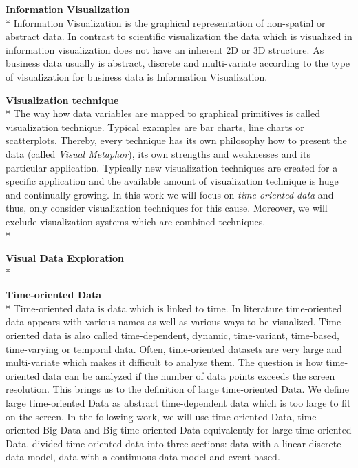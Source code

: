 \textbf{Information Visualization}\\*
Information Visualization is the graphical representation of non-spatial or abstract data\cite{Keim}. In contrast to scientific visualization the data which is visualized in information visualization does not have an inherent 2D or 3D structure\cite{Shneiderman2008}. 
As business data usually is abstract, discrete and multi-variate according to \cite{Tegarden1999} the type of visualization for business data is Information Visualization.

\textbf{Visualization technique}\\*
The way how data variables are mapped to graphical primitives is called visualization technique. Typical examples are bar charts, line charts or scatterplots. Thereby, every technique has its own philosophy how to present the data (called \textit{Visual Metaphor}\cite{Tegarden1999}), its own strengths and weaknesses and its particular application. Typically new visualization techniques are created for a specific application and the available amount of visualization technique is huge and continually growing. In this work we will focus on \textit{time-oriented data} and thus, only consider visualization techniques for this cause. Moreover, we will exclude visualization systems which are combined techniques. 
\\*

\textbf{Visual Data Exploration}\\*

\textbf{Time-oriented Data}\\*
Time-oriented data is data which is linked to time\cite{Aigner2011}. In literature time-oriented data appears with various names as well as various ways to be visualized. Time-oriented data is also called time-dependent, dynamic, time-variant, time-based, time-varying or temporal data\cite{Moere2004}. Often, time-oriented datasets are very large and multi-variate which makes it difficult to analyze them. The question is how time-oriented data can be analyzed if the number of data points exceeds the screen resolution. This brings us to the definition of large time-oriented Data. 
We define large time-oriented Data as abstract time-dependent data which is too large to fit on the screen. \cite{Shneiderman2008} 
In the following work, we will use time-oriented Data, time-oriented Big Data and Big time-oriented Data equivalently for large time-oriented Data.
\cite{Bacic2013} divided time-oriented data into three sections: data with a linear discrete data model, data with a continuous data model and event-based.




